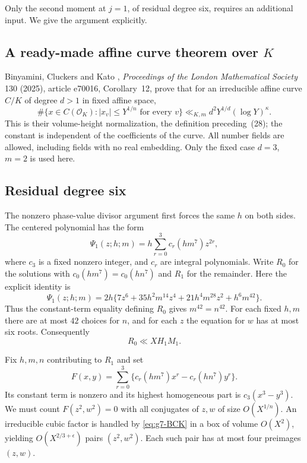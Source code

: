 \documentclass[11pt,reqno]{amsart}
\numberwithin{equation}{section}
\theoremstyle{definition}
\begin{document}
Only the second moment at $j=1$, of residual degree six, requires an additional
input.  We give the argument explicitly.

\subsection{A ready-made affine curve theorem over $K$}

Binyamini, Cluckers and Kato \cite[Corollary~12]{BCK2025}, \emph{Proceedings of the London Mathematical
Society} 130 (2025), article e70016, Corollary~12, prove that for an
irreducible affine curve $C/K$ of degree $d>1$ in fixed affine space,
\begin{equation}\label{eq:g7-BCK}
 \#\{x\in C(\mathcal O_K): |x_v|\le Y^{1/n}\text{ for every }v\}
 \ll_{K,m} d^2Y^{1/d}(\log Y)^\kappa.
\end{equation}
This is their volume-height normalization, the definition preceding~(28); the constant
is independent of the coefficients of the curve.  All number fields are
allowed, including fields with no real embedding.  Only the fixed case
$d=3$, $m=2$ is used here.

\subsection{Residual degree six}

The nonzero phase-value divisor argument first forces the same $h$ on both
sides.  The centered polynomial has the form
\[
 \Psi_1(z;h;m)=h\sum_{r=0}^{3}c_r(hm^7)z^{2r},
\]
where $c_3$ is a fixed nonzero integer, and $c_r$ are integral polynomials.
Write $R_0$ for the solutions with $c_0(hm^7)=c_0(hn^7)$ and $R_1$ for
the remainder.  Here the explicit identity is
\[
 \Psi_1(z;h;m)=2h\{7z^6+35h^2m^{14}z^4
                       +21h^4m^{28}z^2+h^6m^{42}\}.
\]
Thus the constant-term equality defining $R_0$ gives $m^{42}=n^{42}$.
For each fixed $h,m$ there are at most $42$ choices for $n$, and for each
$z$ the equation for $w$ has at most six roots.  Consequently
\[
 R_0\ll XH_1M_1.
\]

Fix $h,m,n$ contributing to $R_1$ and set
\[
 F(x,y)=\sum_{r=0}^{3}\{c_r(hm^7)x^r-c_r(hn^7)y^r\}.
\]
Its constant term is nonzero and its highest homogeneous part is
$c_3(x^3-y^3)$.  We must count $F(z^2,w^2)=0$ with all conjugates of
$z,w$ of size $O(X^{1/n})$.
An irreducible cubic factor is handled by \eqref{eq:g7-BCK} in a box of
volume $O(X^2)$, yielding $O(X^{2/3+\epsilon})$ pairs $(z^2,w^2)$.
Each such pair has at most four preimages $(z,w)$.
\end{document}
